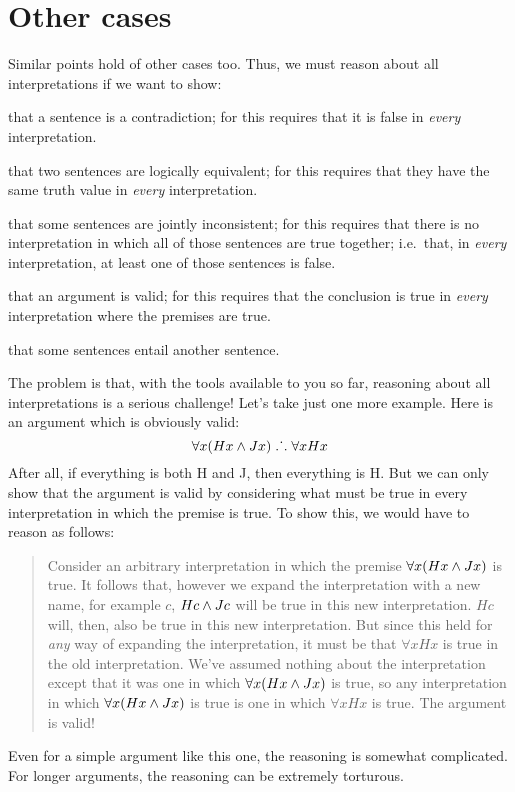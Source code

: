 \section{Other cases}
Similar points hold of other cases too. Thus, we must reason about all interpretations if we want to show:
	\begin{ebullet}
		\item that a sentence is a contradiction; for this requires that it is false in \emph{every} interpretation. 
		\item that two sentences are logically equivalent; for this requires that they have the same truth value in \emph{every} interpretation.
		\item that some sentences are jointly inconsistent; for this requires that there is no interpretation in which all of those sentences are true together; i.e.\ that, in \emph{every} interpretation, at  least one of those sentences is false.
		\item that an argument is valid; for this requires that the conclusion is true in \emph{every} interpretation where the premises are true. 
		\item that some sentences entail another sentence.
	\end{ebullet}
The problem is that, with the tools available to you so far, reasoning about all interpretations is a serious challenge! Let's take just one more example. Here is an argument which is obviously valid:
	$$\forall x(Hx \wedge Jx) \mathrel{\ldotp\dot{}\,\ldotp} \forall x Hx$$
After all, if everything is both H and J, then everything is H. But we can only show that the argument is valid by considering what must be true in every interpretation in which the premise is true. To show this, we would have to reason as follows:
	\begin{quote}
		Consider an arbitrary interpretation in which the premise $\forall x(Hx \wedge Jx)$ is true. It follows that, however we expand the interpretation with a new name, for example $c$, $Hc \wedge Jc$ will be true in this new interpretation. $Hc$ will, then, also be true in this new interpretation. But since this held for \emph{any} way of expanding the interpretation, it must be that $\forall x Hx$ is true in the old interpretation. We've assumed nothing about the interpretation except that it was one in which $\forall x(Hx \wedge Jx)$  is true, so any interpretation in which $\forall x(Hx \wedge Jx)$ is true is one in which $\forall x Hx$ is true. The argument is valid!
\end{quote}
Even for a simple argument like this one, the reasoning is somewhat complicated. For longer arguments, the reasoning can be extremely torturous.

